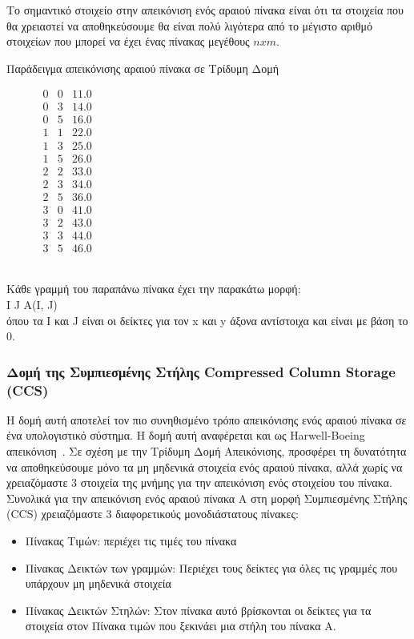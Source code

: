 Το σημαντικό στοιχείο στην απεικόνιση ενός αραιού πίνακα είναι ότι τα στοιχεία που θα χρειαστεί να αποθηκεύσουμε θα είναι πολύ λιγότερα από το μέγιστο αριθμό στοιχείων που μπορεί να έχει ένας πίνακας μεγέθους $n x m$.


Παράδειγμα απεικόνισης αραιού πίνακα σε Τρίδυμη Δομή\\

\begin{figure}[ht]
\centering
$\begin{matrix}
0 & 0 & 11.0\\
0 & 3 & 14.0\\
0 & 5 & 16.0\\
1 & 1 & 22.0\\
1 & 3 & 25.0\\
1 & 5 & 26.0\\
2 & 2 & 33.0\\
2 & 3 & 34.0\\
2 & 5 & 36.0\\
3 & 0 & 41.0\\
3 & 2 & 43.0\\
3 & 3 & 44.0\\
3 & 5 & 46.0
\end{matrix}$
\end{figure}

\\
Κάθε γραμμή του παραπάνω πίνακα έχει την παρακάτω μορφή:\\
\textlatin{I J A(I, J)}\\
όπου τα \textlatin{I} και \textlatin{J} είναι οι δείκτες για τον \textlatin{x} και \textlatin{y} άξονα αντίστοιχα και είναι με βάση το 0.

\subsubsection{Δομή της Συμπιεσμένης Στήλης \textlatin{Compressed Column Storage (CCS)}} \label{CCS}
Η δομή αυτή αποτελεί τον πιο συνηθισμένο τρόπο απεικόνισης ενός αραιού πίνακα σε ένα υπολογιστικό σύστημα. Η δομή αυτή αναφέρεται και ως \textlatin{Harwell-Boeing} απεικόνιση~\cite{duff1989sparse}. Σε σχέση με την Τρίδυμη Δομή Απεικόνισης, προσφέρει τη δυνατότητα να αποθηκεύσουμε μόνο τα μη μηδενικά στοιχεία ενός αραιού πίνακα, αλλά χωρίς να χρειαζόμαστε 3 στοιχεία της μνήμης για την απεικόνιση ενός στοιχείου του πίνακα.
Συνολικά για την απεικόνιση ενός αραιού πίνακα Α στη μορφή Συμπιεσμένης Στήλης \textlatin{(CCS)} χρειαζόμαστε 3 διαφορετικούς μονοδιάστατους πίνακες:
\begin{itemize}
  \item Πίνακας Τιμών: περιέχει τις τιμές του πίνακα
  \item Πίνακας Δεικτών των γραμμών: Περιέχει τους δείκτες για όλες τις γραμμές που υπάρχουν μη μηδενικά στοιχεία
  \item Πίνακας Δεικτών Στηλών: Στον πίνακα αυτό βρίσκονται οι δείκτες για τα στοιχεία στον Πίνακα τιμών που ξεκινάει μια στήλη του πίνακα Α. 
\end{itemize}

